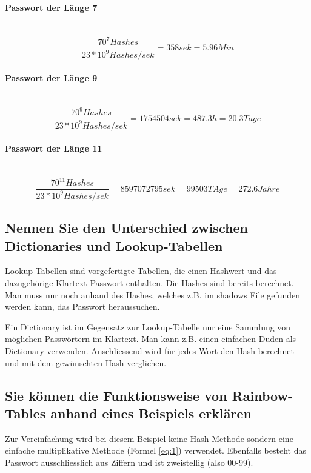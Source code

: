 \documentclass[a4paper, 11pt, nofootinbib]{article}
\begin{document}
\paragraph{Passwort der Länge 7}\mbox{}\\
\begin{equation}
\dfrac{70^{7}  Hashes}{23*10^{9}   Hashes/sek} = 358sek = 5.96 Min \nonumber
\end{equation} 

\paragraph{Passwort der Länge 9}\mbox{}\\
\begin{equation}
\dfrac{70^{9}  Hashes}{23*10^{9}   Hashes/sek} = 1754504sek = 487.3h = 20.3 Tage \nonumber
\end{equation} 

\paragraph{Passwort der Länge 11}\mbox{}\\
\begin{equation}
\dfrac{70^{11}  Hashes}{23*10^{9}   Hashes/sek} = 8597072795sek  = 99503 TAge = 272.6 Jahre \nonumber
\end{equation} 

\subsection{Nennen Sie den Unterschied zwischen Dictionaries und Lookup-Tabellen}
Lookup-Tabellen sind vorgefertigte Tabellen, die einen Hashwert und das dazugehörige Klartext-Passwort enthalten. Die Hashes sind bereits berechnet. Man muss nur noch anhand des Hashes, welches z.B. im shadows File gefunden werden kann, das Passwort heraussuchen. 

Ein Dictionary ist im Gegensatz zur Lookup-Tabelle nur eine Sammlung von möglichen Passwörtern im Klartext. Man kann z.B. einen einfachen Duden als Dictionary verwenden. Anschliessend wird für jedes Wort den Hash berechnet und mit dem gewünschten Hash verglichen.

\subsection{Sie können die Funktionsweise von Rainbow-Tables anhand eines Beispiels erklären}
Zur Vereinfachung wird bei diesem Beispiel keine Hash-Methode sondern eine einfache multiplikative Methode (Formel \ref{eq:1}) verwendet. Ebenfalls besteht das Passwort ausschliesslich aus Ziffern und ist zweistellig (also 00-99).
\end{document}
